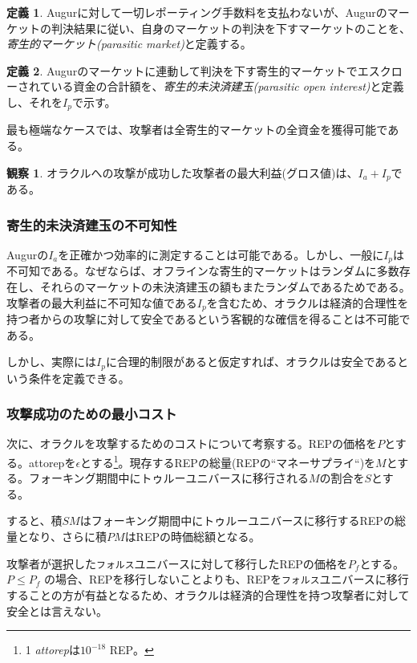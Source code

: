 \documentclass[floatfix,reprint,nofootinbib,amsmath,amssymb,epsfig,pre,floats,letterpaper,groupedaffiliation]{revtex4-1}
\theoremstyle{definition}
\newtheorem{observation}{観察}
\theoremstyle{definition}
\newtheorem{definition}{定義}
\theoremstyle{definition}
\begin{document}
\begin{definition}
Augurに対して一切レポーティング手数料を支払わないが、Augurのマーケットの判決結果に従い、自身のマーケットの判決を下すマーケットのことを、\textit{寄生的マーケット(parasitic market)}と定義する。
\end{definition}

\begin{definition}
 Augurのマーケットに連動して判決を下す寄生的マーケットでエスクローされている資金の合計額を、\textit{寄生的未決済建玉(parasitic open interest)}と定義し、それを$I_p$で示す。
\end{definition}

最も極端なケースでは、攻撃者は全寄生的マーケットの全資金を獲得可能である。

\begin{observation}
オラクルへの攻撃が成功した攻撃者の最大利益(グロス値)は、$I_a + I_p$である。
\end{observation}

\subsubsection{寄生的未決済建玉の不可知性}

Augurの$I_a$を正確かつ効率的に測定することは可能である。しかし、一般に$I_p$は不可知である。なぜならば、オフラインな寄生的マーケットはランダムに多数存在し、それらのマーケットの未決済建玉の額もまたランダムであるためである。攻撃者の最大利益に不可知な値である$I_p$を含むため、オラクルは経済的合理性を持つ者からの攻撃に対して安全であるという客観的な確信を得ることは不可能である。

しかし、実際には$I_p$に合理的制限があると仮定すれば、オラクルは安全であるという条件を定義できる。

\subsubsection{攻撃成功のための最小コスト}

次に、オラクルを攻撃するためのコストについて考察する。REPの価格を$P$とする。attorepを$\epsilon$とする\footnote{1 \textit{attorep}は$10^{-18}$ REP。}。現存するREPの総量(REPの``マネーサプライ“)を$M$とする。フォーキング期間中にトゥルーユニバースに移行される$M$の割合を$S$とする。

すると、積$SM$はフォーキング期間中にトゥルーユニバースに移行するREPの総量となり、さらに積$PM$はREPの時価総額となる。

攻撃者が選択した\texttt{フォルス}ユニバースに対して移行したREPの価格を$P_f$とする。$P \leq P_f$ の場合、REPを移行しないことよりも、REPを\texttt{フォルス}ユニバースに移行することの方が有益となるため、オラクルは経済的合理性を持つ攻撃者に対して安全とは言えない。
\end{document}

